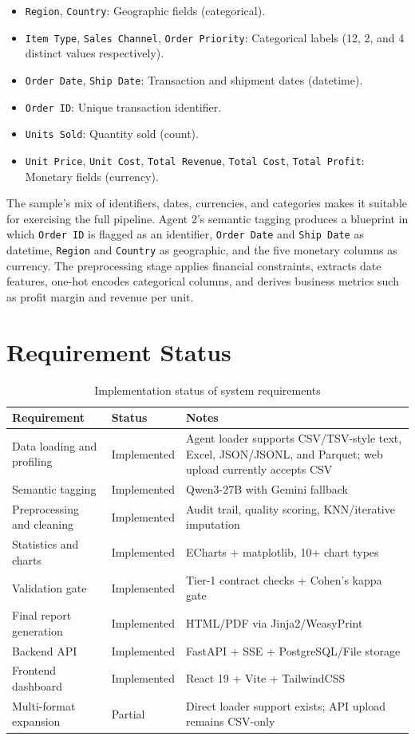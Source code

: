 \documentclass[12pt,a4paper,openany]{report}
\begin{document}
\begin{itemize}
	\item \texttt{Region}, \texttt{Country}: Geographic fields (categorical).
	\item \texttt{Item Type}, \texttt{Sales Channel}, \texttt{Order Priority}: Categorical labels (12, 2, and 4 distinct values respectively).
	\item \texttt{Order Date}, \texttt{Ship Date}: Transaction and shipment dates (datetime).
	\item \texttt{Order ID}: Unique transaction identifier.
	\item \texttt{Units Sold}: Quantity sold (count).
	\item \texttt{Unit Price}, \texttt{Unit Cost}, \texttt{Total Revenue}, \texttt{Total Cost}, \texttt{Total Profit}: Monetary fields (currency).
\end{itemize}

The sample's mix of identifiers, dates, currencies, and categories makes it suitable for exercising the full pipeline. Agent 2's semantic tagging produces a blueprint in which \texttt{Order ID} is flagged as an identifier, \texttt{Order Date} and \texttt{Ship Date} as datetime, \texttt{Region} and \texttt{Country} as geographic, and the five monetary columns as currency. The preprocessing stage applies financial constraints, extracts date features, one-hot encodes categorical columns, and derives business metrics such as profit margin and revenue per unit.

\section{Requirement Status}
\begin{table}[H]
\centering
\caption{Implementation status of system requirements}
\label{tab:req-status}
\begin{tabular}{p{6cm} p{3cm} p{4cm}}
\hline
Requirement & Status & Notes \\
\hline
Data loading and profiling & Implemented & Agent loader supports CSV/TSV-style text, Excel, JSON/JSONL, and Parquet; web upload currently accepts CSV \\
Semantic tagging & Implemented & Qwen3-27B with Gemini fallback \\
Preprocessing and cleaning & Implemented & Audit trail, quality scoring, KNN/iterative imputation \\
Statistics and charts & Implemented & ECharts + matplotlib, 10+ chart types \\
Validation gate & Implemented & Tier-1 contract checks + Cohen's kappa gate \\
Final report generation & Implemented & HTML/PDF via Jinja2/WeasyPrint \\
Backend API & Implemented & FastAPI + SSE + PostgreSQL/File storage \\
Frontend dashboard & Implemented & React 19 + Vite + TailwindCSS \\
Multi-format expansion & Partial & Direct loader support exists; API upload remains CSV-only \\
\hline
\end{tabular}
\end{table}
\end{document}

